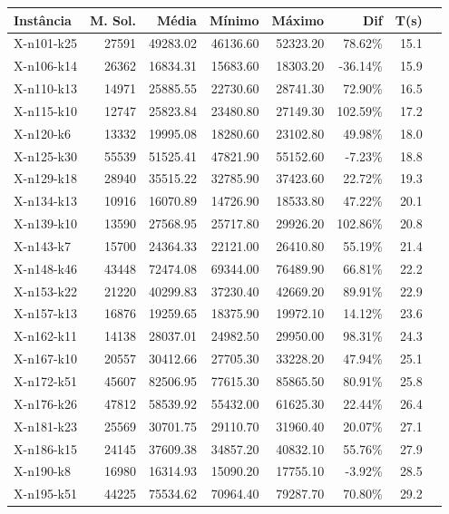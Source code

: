 \documentclass[12pt,a4paper]{article}
\begin{document}
\begin{table}[htbp]
\centering
\small
\begin{tabular}{@{}lrrrrrrr@{}}
\toprule
Instância & M. Sol. & Média & Mínimo & Máximo & Dif & T(s) \\
\midrule
    X-n101-k25 & 27591 & 49283.02 & 46136.60 & 52323.20 & 78.62\% & 15.1 \\
    X-n106-k14 & 26362 & 16834.31 & 15683.60 & 18303.20 & -36.14\% & 15.9 \\
    X-n110-k13 & 14971 & 25885.55 & 22730.60 & 28741.30 & 72.90\% & 16.5 \\
    X-n115-k10 & 12747 & 25823.84 & 23480.80 & 27149.30 & 102.59\% & 17.2 \\
    X-n120-k6 & 13332 & 19995.08 & 18280.60 & 23102.80 & 49.98\% & 18.0 \\
    X-n125-k30 & 55539 & 51525.41 & 47821.90 & 55152.60 & -7.23\% & 18.8 \\
    X-n129-k18 & 28940 & 35515.22 & 32785.90 & 37423.60 & 22.72\% & 19.3 \\
    X-n134-k13 & 10916 & 16070.89 & 14726.90 & 18533.80 & 47.22\% & 20.1 \\
    X-n139-k10 & 13590 & 27568.95 & 25717.80 & 29926.20 & 102.86\% & 20.8 \\
    X-n143-k7 & 15700 & 24364.33 & 22121.00 & 26410.80 & 55.19\% & 21.4 \\
    X-n148-k46 & 43448 & 72474.08 & 69344.00 & 76489.90 & 66.81\% & 22.2 \\
    X-n153-k22 & 21220 & 40299.83 & 37230.40 & 42669.20 & 89.91\% & 22.9 \\
    X-n157-k13 & 16876 & 19259.65 & 18375.90 & 19972.10 & 14.12\% & 23.6 \\
    X-n162-k11 & 14138 & 28037.01 & 24982.50 & 29950.00 & 98.31\% & 24.3 \\
    X-n167-k10 & 20557 & 30412.66 & 27705.30 & 33228.20 & 47.94\% & 25.1 \\
    X-n172-k51 & 45607 & 82506.95 & 77615.30 & 85865.50 & 80.91\% & 25.8 \\
    X-n176-k26 & 47812 & 58539.92 & 55432.00 & 61625.30 & 22.44\% & 26.4 \\
    X-n181-k23 & 25569 & 30701.75 & 29110.70 & 31960.40 & 20.07\% & 27.1 \\
    X-n186-k15 & 24145 & 37609.38 & 34857.20 & 40832.10 & 55.76\% & 27.9 \\
    X-n190-k8 & 16980 & 16314.93 & 15090.20 & 17755.10 & -3.92\% & 28.5 \\
    X-n195-k51 & 44225 & 75534.62 & 70964.40 & 79287.70 & 70.80\% & 29.2 \\

\end{tabular}
\end{table}
\end{document}
